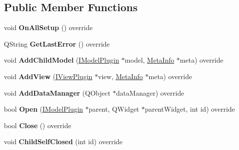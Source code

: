 \subsection*{Public Member Functions}
\begin{DoxyCompactItemize}
\item 
void {\bfseries On\+All\+Setup} () override\hypertarget{class_neural_network_model_ae10c5a6387aa0752663d4c0ee07ed5ca}{}\label{class_neural_network_model_ae10c5a6387aa0752663d4c0ee07ed5ca}

\item 
Q\+String {\bfseries Get\+Last\+Error} () override\hypertarget{class_neural_network_model_ab9c3d8c5d6ae87dc0ed6e0650e614eb3}{}\label{class_neural_network_model_ab9c3d8c5d6ae87dc0ed6e0650e614eb3}

\item 
void {\bfseries Add\+Child\+Model} (\hyperlink{class_i_model_plugin}{I\+Model\+Plugin} $\ast$model, \hyperlink{struct_meta_info}{Meta\+Info} $\ast$meta) override\hypertarget{class_neural_network_model_a76c4f2032b0bc283e59efcf90617ca45}{}\label{class_neural_network_model_a76c4f2032b0bc283e59efcf90617ca45}

\item 
void {\bfseries Add\+View} (\hyperlink{class_i_view_plugin}{I\+View\+Plugin} $\ast$view, \hyperlink{struct_meta_info}{Meta\+Info} $\ast$meta) override\hypertarget{class_neural_network_model_ab819ce176d4dd2d2709b4db3304db5ef}{}\label{class_neural_network_model_ab819ce176d4dd2d2709b4db3304db5ef}

\item 
void {\bfseries Add\+Data\+Manager} (Q\+Object $\ast$data\+Manager) override\hypertarget{class_neural_network_model_ad20c25a3b27c40fbb448997adbf35e72}{}\label{class_neural_network_model_ad20c25a3b27c40fbb448997adbf35e72}

\item 
bool {\bfseries Open} (\hyperlink{class_i_model_plugin}{I\+Model\+Plugin} $\ast$parent, Q\+Widget $\ast$parent\+Widget, int id) override\hypertarget{class_neural_network_model_af003d712b60ba136f9fd1ace2fd259b6}{}\label{class_neural_network_model_af003d712b60ba136f9fd1ace2fd259b6}

\item 
bool {\bfseries Close} () override\hypertarget{class_neural_network_model_abb5e21816c1d96313a45e4618a1ff933}{}\label{class_neural_network_model_abb5e21816c1d96313a45e4618a1ff933}

\item 
void {\bfseries Child\+Self\+Closed} (int id) override\hypertarget{class_neural_network_model_addf09b66c86a981187257b82c030542d}{}\label{class_neural_network_model_addf09b66c86a981187257b82c030542d}


\end{DoxyCompactItemize}

